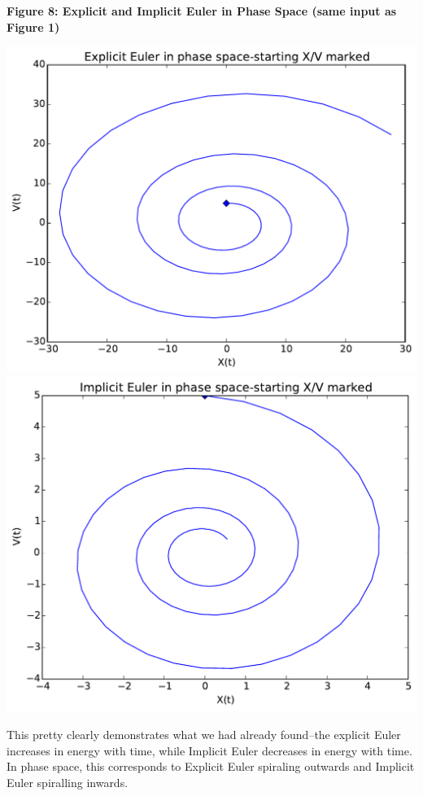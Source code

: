 \documentclass{article}
\begin{document}
\begin{minipage}{1.0\textwidth}
\begin{center}
    \textbf{Figure 8: Explicit and Implicit Euler in Phase Space (same input as Figure 1)}\par\medskip
    \includegraphics[scale=0.7]{eE_phaseSpace}
    \includegraphics[scale=0.7]{iE_phaseSpace}
\end{center}
\end{minipage}

This pretty clearly demonstrates what we had already found--the explicit Euler increases in energy with time, while Implicit Euler decreases in energy with time. In phase space, this corresponds to Explicit Euler spiraling outwards and Implicit Euler spiralling inwards.
\end{document}
